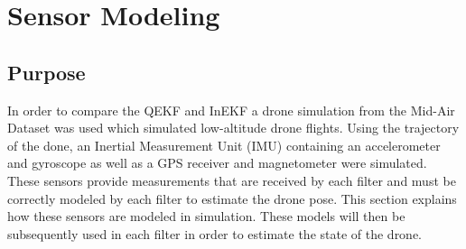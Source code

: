\section{Sensor Modeling}
\subsection{Purpose}
In order to compare the QEKF and InEKF a drone simulation from the Mid-Air Dataset \cite{Fonder2019MidAir} was used which simulated low-altitude drone flights. Using the trajectory of the done, an Inertial Measurement Unit (IMU) containing an accelerometer and gyroscope as well as a GPS receiver and magnetometer were simulated. These sensors provide measurements that are received by each filter and must be correctly modeled by each filter to estimate the drone pose. This section explains how these sensors are modeled in simulation. These models will then be subsequently used in each filter in order to estimate the state of the drone.

